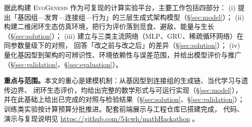 据此构建 \textsc{EvoGenesis} 作为可复现的计算实验平台，主要工作包括四部分：
(i) 提出「基因组—发育—连接组—行为」的三层生成式架构模型（\S\ref{sec:model}）；
(ii) 构建二维闭环生态仿真环境，把行为评价落到觅食、避敌、能量与生长（\S\ref{sec:solution}）；
(iii) 建立与三类主流网络（MLP、GRU、稀疏循环网络）在同参数量级下的对照，
      回答「改之前与改之后」的差异（\S\ref{sec:solution}）；
(iv) 量化基因型到架构的可辨识性、环境依赖性与误差范围，并给出模型评价与推广（\S\ref{sec:validation}、\S\ref{sec:evaluation}）。

\textbf{重点与范围。}本文的重心是建模机制：从基因型到连接组的生成链、当代学习与遗传边界、
闭环生态评价，均给出完整的数学形式与可运行实现（\S\ref{sec:model}），
并在此基础上给出已完成的对照与检验结果（\S\ref{sec:solution}、\S\ref{sec:validation}）；
训练类实验按计算预算分批推进。配套前端展示与工程仓库已搭建完成，
代码、演示与复现说明见 \url{https://github.com/54cwh/mathHackathon} 。
